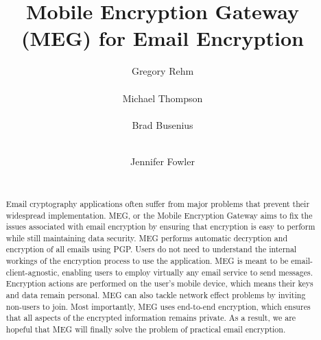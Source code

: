 \documentclass{sig-alternate-05-2015}
\begin{document}
\title{Mobile Encryption Gateway (MEG) for Email Encryption}

\author{
\alignauthor
Gregory Rehm\\
    \\
\alignauthor
Michael Thompson\\
    \\
\alignauthor
Brad Busenius\\
    \\
\and
\alignauthor
Jennifer Fowler\\
    \\
}
\date {}
\maketitle

\begin{abstract}
\par Email cryptography applications often suffer from major problems that prevent their widespread implementation. MEG, or the Mobile Encryption Gateway aims to fix the issues associated with email encryption by ensuring that encryption is easy to perform while still maintaining data security. MEG performs automatic decryption and encryption of all emails using PGP. Users do not need to understand the internal workings of the encryption process to use the application. MEG is meant to be email-client-agnostic, enabling users to employ virtually any email service to send messages. Encryption actions are performed on the user's mobile device, which means their keys and data remain personal. MEG can also tackle network effect problems by inviting non-users to join. Most importantly, MEG uses end-to-end encryption, which ensures that all aspects of the encrypted information remains private. As a result, we are hopeful that MEG will finally solve the problem of practical email encryption.
\end{abstract}
\end{document}
